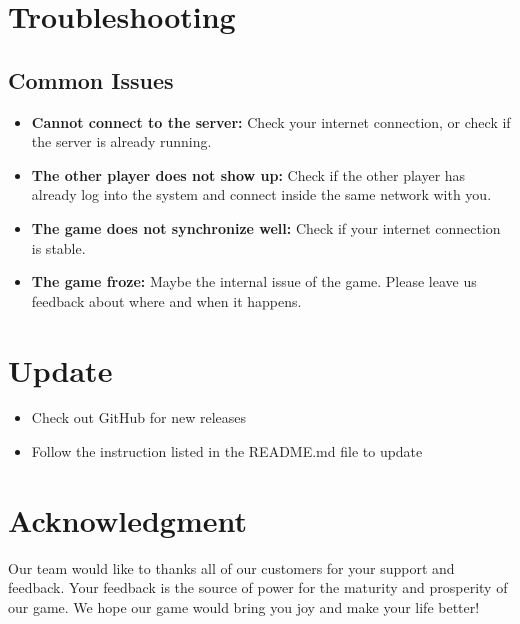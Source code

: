 \documentclass[12pt, titlepage]{article}
\begin{document}
\section{Troubleshooting}

\subsection{Common Issues}
\begin{itemize}
    \item \textbf{Cannot connect to the server:} Check your internet connection, or check if the server is already running.
    \item \textbf{The other player does not show up:} Check if the other player has already log into the system and connect inside the same network with you.
    \item \textbf{The game does not synchronize well:} Check if your internet connection is stable.
    \item \textbf{The game froze:} Maybe the internal issue of the game. Please leave us feedback about where and when it happens.
\end{itemize}

\section{Update}
\begin{itemize}
    \item Check out GitHub for new releases
    \item Follow the instruction listed in the README.md file to update
\end{itemize}

\section{Acknowledgment}
Our team would like to thanks all of our customers for your support and feedback. Your feedback is the source of power for the maturity and prosperity of our game. We hope our game would bring you joy and make your life better!
\end{document}
